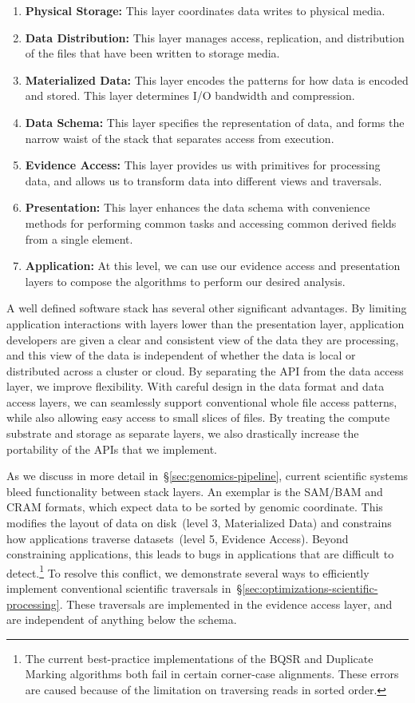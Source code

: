 \documentclass{acm_proc_article-sp}
\begin{document}
\begin{enumerate}
\item {\bf Physical Storage:} This layer coordinates data writes to physical media.
\item {\bf Data Distribution:} This layer manages access, replication, and distribution of the files that have
been written to storage media.
\item {\bf Materialized Data:} This layer encodes the patterns for how data is encoded and stored. This
layer determines I/O bandwidth and compression.
\item {\bf Data Schema:} This layer specifies the representation of data, and forms the narrow waist of
the stack that separates access from execution.
\item {\bf Evidence Access:} This layer provides us with primitives for processing data, and allows us to
transform data into different views and traversals.
\item {\bf Presentation:} This layer enhances the data schema with convenience methods for performing
common \linebreak tasks and accessing common derived fields from a single element.
\item {\bf Application:} At this level, we can use our evidence access and presentation layers to compose
the algorithms to perform our desired analysis.
\end{enumerate}

A well defined software stack has several other significant advantages. By limiting application
interactions with layers lower than the presentation layer, application developers are given a clear and
consistent view of the data they are processing, and this view of the data is independent of whether the
data is local or distributed across a cluster or cloud. By separating the API from the data access layer,
we improve flexibility. With careful design in the data format and data access layers, we can seamlessly
support conventional whole file access patterns, while also allowing easy access to small slices of files.
By treating the compute substrate and storage as separate layers, we also drastically increase
the portability of the APIs that we implement.

As we discuss in more detail in~\S\ref{sec:genomics-pipeline}, current scientific systems bleed
functionality between stack layers. An exemplar is the SAM/BAM and CRAM formats, which expect data
to be sorted by genomic coordinate. This modifies the layout of data on disk~(level 3, Materialized Data)
and constrains how applications traverse datasets~(level 5, Evidence Access). Beyond
constraining applications, this leads to bugs in applications that are difficult to detect.\footnote{The
current best-practice implementations of the BQSR and Duplicate Marking algorithms both fail in certain
corner-case alignments. These errors are caused because of the limitation on traversing reads in sorted
order.} To resolve this conflict, we demonstrate several ways to efficiently implement conventional scientific
traversals in~\S\ref{sec:optimizations-scientific-processing}. These traversals are implemented in the
evidence access layer, and are independent of anything below the schema.
\end{document}
